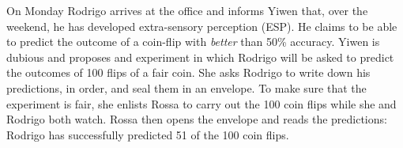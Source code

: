 \documentclass[addpoints,12pt]{exam}
\begin{document}
\begin{questions}


\question On Monday Rodrigo arrives at the office and informs Yiwen that, over the weekend, he has developed extra-sensory perception (ESP). 
He claims to be able to predict the outcome of a coin-flip with \emph{better} than 50\% accuracy.
Yiwen is dubious and proposes and experiment in which Rodrigo will be asked to predict the outcomes of 100 flips of a fair coin.
She asks Rodrigo to write down his predictions, in order, and seal them in an envelope.
To make sure that the experiment is fair, she enlists Rossa to carry out the 100 coin flips while she and Rodrigo both watch. 
Rossa then opens the envelope and reads the predictions: Rodrigo has successfully predicted 51 of the 100 coin flips. 
\begin{parts}

\end{parts}
\end{questions}
\end{document}
